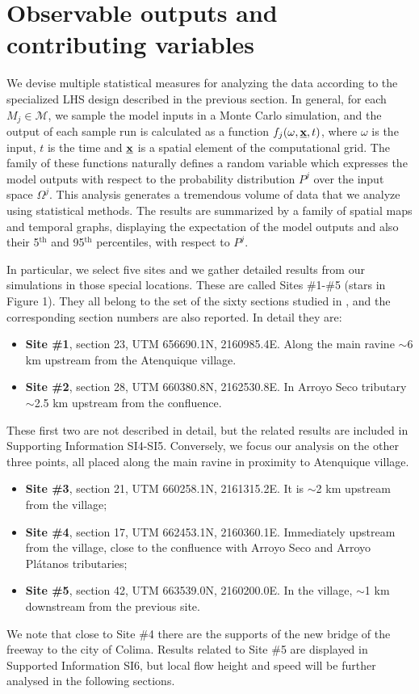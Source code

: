 \documentclass[nhess, manuscript]{copernicus}
\begin{document}
\section{Observable outputs and contributing variables}\label{s3}
We devise multiple statistical measures for analyzing the data according to the specialized LHS design described in the previous section. In general, for each $M_j\in\mathcal M$, we sample the model inputs in a Monte Carlo simulation, and the output of each sample run is calculated as a function $f_j(\omega, \underline{\textbf x},t)$, where $\omega$ is the input, $t$ is the time and $\underline{\textbf x}$ is a spatial element of the computational grid. The family of these functions naturally defines a random variable which expresses the model outputs with respect to the probability distribution $P^j$ over the input space $\Omega^j$. This analysis generates a tremendous volume of data that we analyze using statistical methods. The results are summarized by a family of spatial maps and temporal graphs, displaying the expectation of the model outputs and also their 5$^{\mathrm{th}}$ and 95$^{\mathrm{th}}$ percentiles, with respect to $P^j$.

In particular, we select five sites and we gather detailed results from our simulations in those special locations. These are called Sites \#1-\#5  (stars in Figure 1). They all belong to the set of the sixty sections studied in \cite{Saucedo2008}, and the corresponding section numbers are also reported. In detail they are:
\begin{itemize}
\item\textbf{Site \#1}, section 23, UTM 656690.1N, 2160985.4E. Along the main ravine $\sim$6 km upstream from the Atenquique village.
\item\textbf{Site \#2}, section 28, UTM 660380.8N, 2162530.8E. In Arroyo Seco tributary $\sim$2.5 km upstream from the confluence.
\end{itemize}

These first two are not described in detail, but the related results are included in Supporting Information SI4-SI5. Conversely, we focus our analysis on the other three points, all placed along the main ravine in proximity to Atenquique village.
\begin{itemize}
\item\textbf{Site \#3}, section 21, UTM 660258.1N, 2161315.2E. It is $\sim$2 km upstream from the village;
\item\textbf{Site \#4}, section 17, UTM 662453.1N, 2160360.1E. Immediately upstream from the village, close to the confluence with Arroyo Seco and Arroyo Pl\'atanos tributaries;
\item\textbf{Site \#5}, section 42, UTM 663539.0N, 2160200.0E. In the village, $\sim$1 km downstream from the previous site.
\end{itemize}
We note that close to Site \#4 there are the supports of the new bridge of the freeway to the city of Colima. Results related to Site \#5 are displayed in Supported Information SI6, but local flow height and speed will be further analysed in the following sections.
\end{document}

